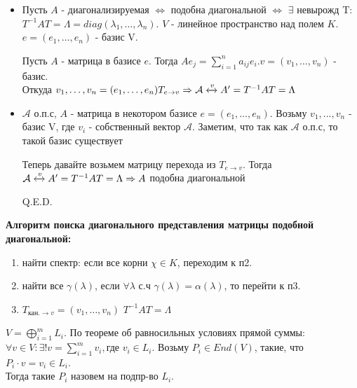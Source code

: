 \begin{itemize}
    \item  \fbox{\(\Rightarrow\)}
    
    Пусть $A$ - диагонализируемая $\Leftrightarrow$ подобна диагональной $\Leftrightarrow$ $\exists$ невырожд T: $T^{-1}AT=\Lambda=diag(\lambda_1,\ldots,\lambda_n)$. $V$ - линейное пространство над полем $K$. $e = (e_1,\ldots,e_n)$ - базис V.

    Пусть $A$ - матрица в базисе $e$. Тогда $Ae_j = \sum\limits_{i=1}^na_{ij}e_i$.$v =(v_1,\ldots,v_n)$ - базис.\\Откуда $v_1,\ldots,v_n = (e_1,\ldots,e_n)T_{e\rightarrow v} \Rightarrow \mathcal{A}\xleftrightarrow{v} A' = T^{-1}AT=\Lambda$ 
    \item \fbox{\(\Leftarrow\)}
    $\mathcal{A}$ о.п.с, $A$ - матрица в некотором базисе $e= (e_1,\ldots,e_n)$.
    Возьму $v_1, ..., v_n$ - базис V, где $v_i$ - собственный вектор $\mathcal{A}$. Заметим, что так как $\mathcal{A}$ о.п.с, то такой базис существует

   Теперь давайте возьмем матрицу перехода из $T_{e\rightarrow v}$. Тогда $\mathcal{A}\xleftrightarrow{v} A' = T^{-1}AT=\Lambda \Rightarrow A$ подобна диагональной   

    \hfill Q.E.D.
\end{itemize}
   
\textbf{Алгоритм поиска диагонального представления матрицы подобной диагональной:}
\begin{enumerate}
    \item найти спектр: если все корни $\chi \in K $, переходим к п2.
    \item найти все $\gamma(\lambda)$, если $\forall \lambda$ с.ч $\gamma(\lambda) = \alpha(\lambda)$, то перейти к п3.
    \item $T_{\text{кан.}\rightarrow v} = (v_1,\ldots,v_n)$ $T^{-1}AT = \Lambda$
\end{enumerate}







 $V = \bigoplus\limits_{i=1}^mL_i$. По теореме об равносильных условиях прямой суммы: 
\\$\forall v\in V: \exists! v = \sum\limits_{i=1}^mv_i, \text{где } v_i \in L_i$. Возьму $P_i \in  End(V)$,  такие, что $P_i \cdot v = v_i \in L_i$.\\ Тогда такие $P_i$ назовем  на подпр-во $L_i$.



